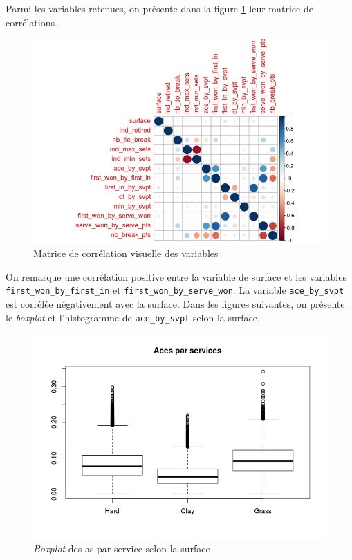 Parmi les variables retenues, on présente dans la figure \ref{fig:corrplot} leur matrice de corrélations.

\begin{figure}[H]
	\caption{Matrice de corrélation visuelle des variables}
	\label{fig:corrplot}
	\includegraphics[width=\textwidth]{corrplot}
\end{figure}

On remarque une corrélation positive entre la variable de surface et les variables \texttt{first\_won\_by\_first\_in} et \texttt{first\_won\_by\_serve\_won}. La variable \texttt{ace\_by\_svpt} est corrélée négativement avec la surface. Dans les figures suivantes, on présente le \textit{boxplot} et l'histogramme de \texttt{ace\_by\_svpt} selon la surface.

\begin{figure}[H]
	\caption{\textit{Boxplot} des as par service selon la surface}
	\label{fig:acebyserve}
	\includegraphics[width=\textwidth]{acevssurface}
\end{figure}

